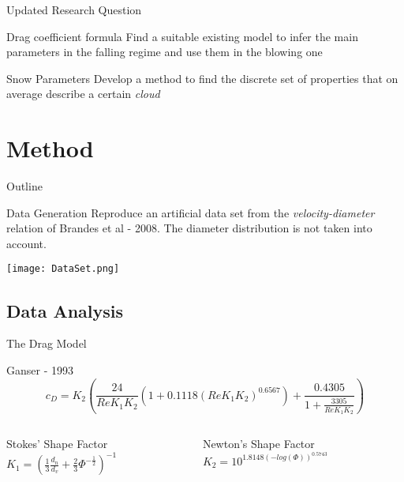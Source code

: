 \documentclass{beamer}
\begin{document}
    \begin{frame}{Updated Research Question}
		\begin{block}{Drag coefficient formula}
			Find a suitable existing model to infer the main parameters in the falling regime and use them in the blowing one
		\end{block}
	
		\begin{block}{Snow Parameters}
			Develop a method to find the discrete set of properties that on average describe a certain \textit{cloud}
		\end{block}
	\end{frame}
    
\section{Method}
    \begin{frame}{Outline}
    	\tableofcontents[currentsection]
    \end{frame}
    
    \begin{frame}{Data Generation}
		Reproduce an artificial data set from the \textit{velocity-diameter} relation of Brandes et al - 2008. The diameter distribution is not taken into account.
		
		\centering
		\texttt{[image: DataSet.png]}
    \end{frame}

\subsection{Data Analysis}
	\begin{frame}{The Drag Model}
		\begin{block}{Ganser - 1993}
			\begin{equation*}
				c_D = K_2 \left( \frac{24}{Re K_1 K_2} (1 + 0.1118 (Re K_1 K_2)^{0.6567}) + \frac{0.4305}{1 + \frac{3305}{Re K_1 K_2}}\right) 
			\end{equation*}
			\vfill
		\end{block}
		
		
		\begin{columns}[T]
			\begin{column}{.4\textwidth}
				\begin{block}{Stokes' Shape Factor}
					\centering
					$ K_1 = \left( \frac{1}{3} \frac{d_n}{d_v} + \frac{2}{3} \Phi^{-\frac{1}{2}} \right)^{-1} $
				\end{block}
			\end{column}
			
			\begin{column}{.4\textwidth}
				\begin{block}{Newton's Shape Factor}
					\centering
					$ K_2 = 10^{1.8148 (-log(\Phi))^{0.5743}} $
				\end{block}
			\end{column}
		\end{columns}
	\end{frame}
\end{document}
